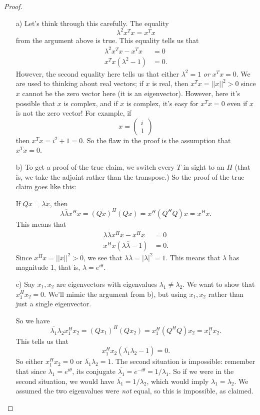 \documentclass{article}
\theoremstyle{definition}
\begin{document}
\begin{proof}
	\begin{itemize}
		\item[a)] Let's think through this carefully. The equality 
		\[\lambda^2 x^Tx= x^Tx\]
		from the argument above is true. This equality tells us that 
		\begin{align*}
			\lambda^2 x^Tx- x^Tx&=0\\
			x^Tx(\lambda^2-1)&=0.
		\end{align*}
	However, the second equality here tells us that either $\lambda^2=1$ \emph{or} $x^Tx=0$. We are used to thinking about real vectors; if $x$ is real, then $x^Tx=||x||^2>0$ since $x$ cannot be the zero vector here (it is an eigenvector). However, here it's possible that $x$ is complex, and if $x$ is complex, it's easy for $x^Tx=0$ even if $x$ is not the zero vector! For example, if 
	\[x=\begin{pmatrix}
		i\\1
	\end{pmatrix}\]
then $x^Tx=i^2+1=0$. So the flaw in the proof is the assumption that $x^Tx=0$.
	\item[b)] To get a proof of the true claim, we switch every $T$ in sight to an $H$ (that is, we take the adjoint rather than the transpose.) So the proof of the true claim goes like this: 
	
If $Qx = \lambda x$, then
	\[\lambda \overline{\lambda} x^H x = (Qx)^H (Qx) = x^H (Q^H Q) x = x^Hx. \]
	This means that 
		\begin{align*}
		\lambda \overline{\lambda} x^Hx- x^Hx&=0\\
		x^Hx(\lambda \overline{\lambda}-1)&=0.
	\end{align*}
	Since $x^Hx=||x||^2>0$, we see that $\lambda \overline{\lambda} = |\lambda|^2=1$.  This means that $\lambda$ has magnitude 1, that is, $\lambda=e^{i \theta}$.
	\item[c)] Say $x_1, x_2$ are eigenvectors with eigenvalues $\lambda_1 \neq \lambda_2$. We want to show that $x_1^Hx_2=0$. We'll mimic the argument from b), but using $x_1, x_2$ rather than just a single eigenvector.
	
	So we have 
	\[\overline{\lambda_1}\lambda_2 x_1^H x_2= (Qx_1)^H (Qx_2)= x_1^H(Q^HQ)x_2=x_1^Hx_2. \]
	This tells us that 
	\[x_1^H x_2(\overline{\lambda_1}\lambda_2 -1)=0.\]
	So either $x_1^H x_2=0$ or $\overline{\lambda_1}\lambda_2 =1$. The second situation is impossible: remember that since $\lambda_1= e^{i \theta}$, its conjugate $\overline{\lambda_1}=e^{-i\theta}= 1/\lambda_1$. So if we were in the second situation, we would have $\overline{\lambda_1}= 1/\lambda_2$, which would imply $\lambda_1=\lambda_2$. We assumed the two eigenvalues were \emph{not} equal, so this is impossible, as claimed.
	

\end{itemize}
\end{proof}
\end{document}
